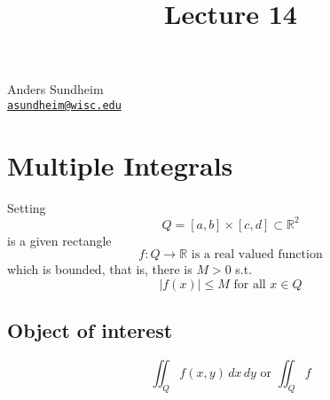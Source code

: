 \documentclass[12pt]{article}
\title{Lecture 14}
\newcommand{\BR}{\mathbb R}
\begin{document}
\maketitle
\vspace*{-0.25in}
\begin{center}
	Anders Sundheim \\
	\href{mailto:asundheim@wisc.edu}{{\tt asundheim@wisc.edu}}
\end{center}
\section*{Multiple Integrals}
Setting \\
\[ Q=[a,b]\times[c,d]\subset\BR^2 \]
is a given rectangle \\
\[ f:Q\rightarrow\BR\text{ is a real valued function} \]
which is bounded, that is, there is $M>0$ s.t. \\
\[ |f(x)|\leq M\text{ for all }x\in Q \]
\subsection*{Object of interest}
\[ \iint_Qf(x,y)\,dx\,dy\text { or }\iint_Qf \]
\end{document}
